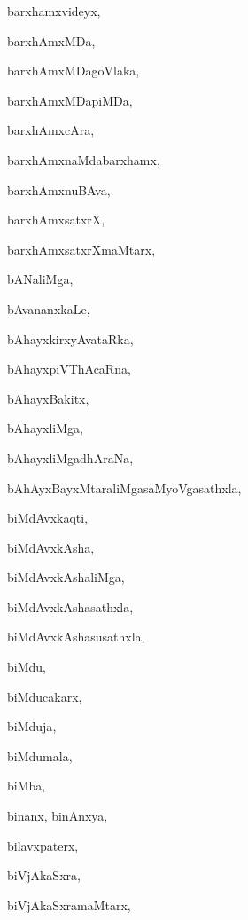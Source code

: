 \begin{multicols}{2}
{barxhamxvideyx}, \pageref{barxhamxvideyx}

{barxhAmxMDa}, \pageref{barxhAmxMDa}

{barxhAmxMDagoVlaka}, \pageref{barxhAmxMDagoVlaka}

{barxhAmxMDapiMDa}, \pageref{barxhAmxMDapiMDa}

{barxhAmxcAra}, \pageref{barxhAmxcAra}

{barxhAmxnaMdabarxhamx}, \pageref{barxhAmxnaMdabarxhamx}

{barxhAmxnuBAva}, \pageref{barxhAmxnuBAva}

{barxhAmxsatxrX}, \pageref{barxhAmxsatxrX}

{barxhAmxsatxrXmaMtarx}, \pageref{barxhAmxsatxrXmaMtarx}

{bANaliMga}, \pageref{bANaliMga}

{bAvananxkaLe}, \pageref{bAvananxkaLe}

{bAhayxkirxyAvataRka}, \pageref{bAhayxkirxyAvataRka}

{bAhayxpiVThAcaRna}, \pageref{bAhayxpiVThAcaRna}

{bAhayxBakitx}, \pageref{bAhayxBakitx}

{bAhayxliMga}, \pageref{bAhayxliMga}

{bAhayxliMgadhAraNa}, \pageref{bAhayxliMgadhAraNa}

{bAhAyxBayxMtaraliMgasaMyoVgasathxla}, \pageref{bAhAyxBayxMtaraliMgasaMyoVgasathxla}

{biMdAvxkaqti}, \pageref{biMdAvxkaqti}

{biMdAvxkAsha}, \pageref{biMdAvxkAsha}

{biMdAvxkAshaliMga}, \pageref{biMdAvxkAshaliMga}

{biMdAvxkAshasathxla}, \pageref{biMdAvxkAshasathxla}

{biMdAvxkAshasusathxla}, \pageref{biMdAvxkAshasusathxla}

{biMdu}, \pageref{biMdu}

{biMducakarx}, \pageref{biMducakarx}

{biMduja}, \pageref{biMduja}

{biMdumala}, \pageref{biMdumala}

{biMba}, \pageref{biMba}

{binanx, binAnxya}, \pageref{binanx, binAnxya}

{bilavxpaterx}, \pageref{bilavxpaterx}

{biVjAkaSxra}, \pageref{biVjAkaSxra}

{biVjAkaSxramaMtarx}, \pageref{biVjAkaSxramaMtarx}


\end{multicols}
